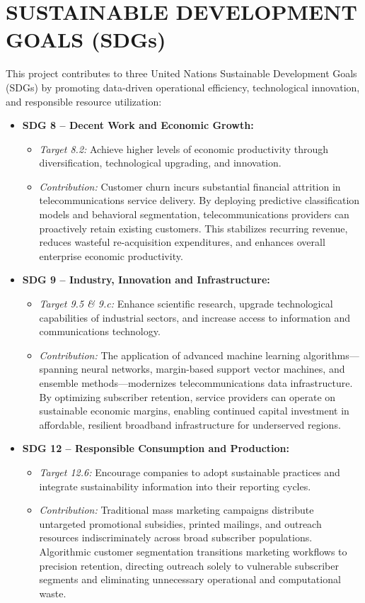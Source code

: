 \documentclass[12pt,oneside]{report}
\newcommand{\chapterpage}[1]{\chapter{#1}}
\begin{document}
\clearpage

\chapterpage{SUSTAINABLE DEVELOPMENT GOALS (SDGs)}

This project contributes to three United Nations Sustainable Development Goals (SDGs) by promoting data-driven operational efficiency, technological innovation, and responsible resource utilization:

\begin{itemize}
    \item \textbf{SDG 8 -- Decent Work and Economic Growth:}
    \begin{itemize}
        \item \textit{Target 8.2:} Achieve higher levels of economic productivity through diversification, technological upgrading, and innovation.
        \item \textit{Contribution:} Customer churn incurs substantial financial attrition in telecommunications service delivery. By deploying predictive classification models and behavioral segmentation, telecommunications providers can proactively retain existing customers. This stabilizes recurring revenue, reduces wasteful re-acquisition expenditures, and enhances overall enterprise economic productivity.
    \end{itemize}

    \item \textbf{SDG 9 -- Industry, Innovation and Infrastructure:}
    \begin{itemize}
        \item \textit{Target 9.5 \& 9.c:} Enhance scientific research, upgrade technological capabilities of industrial sectors, and increase access to information and communications technology.
        \item \textit{Contribution:} The application of advanced machine learning algorithms---spanning neural networks, margin-based support vector machines, and ensemble methods---modernizes telecommunications data infrastructure. By optimizing subscriber retention, service providers can operate on sustainable economic margins, enabling continued capital investment in affordable, resilient broadband infrastructure for underserved regions.
    \end{itemize}

    \item \textbf{SDG 12 -- Responsible Consumption and Production:}
    \begin{itemize}
        \item \textit{Target 12.6:} Encourage companies to adopt sustainable practices and integrate sustainability information into their reporting cycles.
        \item \textit{Contribution:} Traditional mass marketing campaigns distribute untargeted promotional subsidies, printed mailings, and outreach resources indiscriminately across broad subscriber populations. Algorithmic customer segmentation transitions marketing workflows to precision retention, directing outreach solely to vulnerable subscriber segments and eliminating unnecessary operational and computational waste.
    \end{itemize}
\end{itemize}
\end{document}
